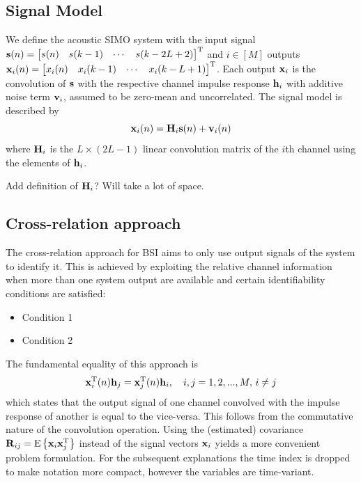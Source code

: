 \documentclass{article}
\newcommand{\h}{\mtxb{h}}
\newcommand{\x}{\mtxb{x}}
\newcommand{\R}{\mtxb{R}}
\begin{document}
\subsection{Signal Model}
\label{ssec:signal_model}
We define the acoustic SIMO system with the input signal \(\bm{\mathrm{s}}(n) = \begin{bmatrix}
    s(n)&s(k-1)&\cdots&s(k-2L+2)
\end{bmatrix}^{{\mathrm{T}}}\) and \(i \in [M]\) outputs 
\(
    \x_i(n) = \begin{bmatrix}
        x_i(n)&x_i(k-1)&\cdots&x_i(k-L+1)
    \end{bmatrix}^{\T}
\).
Each output \(\x_i\) is the convolution of \(\bm{\mathrm{s}}\) with the respective channel impulse response \(\h_i\) with additive noise term \(\bm{\mathrm{v}}_i\), assumed to be zero-mean and uncorrelated.
The signal model is described by
\begin{equation}
    \x_i(n) = \mtxb{H}_i \mtxb{s}(n) + \mtxb{v}_i(n)
\end{equation}
where \(\bm{\mathrm{H}}_i\) is the \(L \times (2L-1)\) linear convolution matrix of the \(i\)th channel using the elements of \(\h_i\).
\begin{note}
    Add definition of \(\bm{\mathrm{H}}_i\)? Will take a lot of space.
\end{note}

\subsection{Cross-relation approach}
\label{ssec:cross_rel}
The cross-relation approach for BSI \cite{} aims to only use output signals of the system to identify it.
This is achieved by exploiting the relative channel information when more than one system output are available and certain identifiability conditions are satisfied:
\begin{itemize}
    \item Condition 1
    \item Condition 2
\end{itemize}

\noindent The fundamental equality of this approach is 
\begin{equation}
    \x_i^{\T}(n) \h_j = \x_j^{\T}(n) \h_i,\quad i,j=1,2,...,M,\,i\neq j\label{eq:cross_rel:equality_conv}
\end{equation}
which states that the output signal of one channel convolved with the impulse response of another is equal to the vice-versa.
This follows from the commutative nature of the convolution operation.
Using the (estimated) covariance \(\R_{ij} = \ev{\x_i \x_j^\T}\) instead of the signal vectors \(\x_i\) yields a more convenient problem formulation.
For the subsequent explanations the time index is dropped to make notation more compact, however the variables are time-variant.
\end{document}
